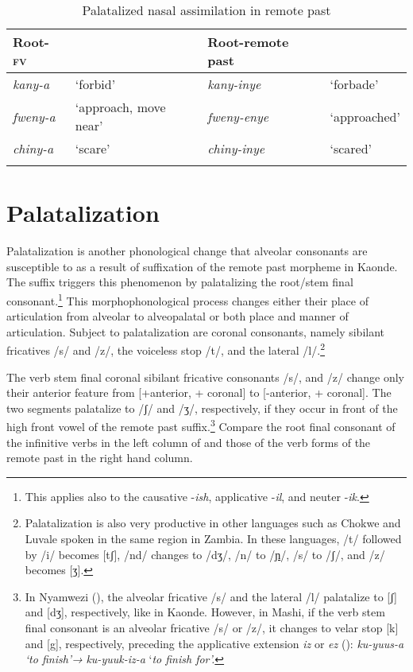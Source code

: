 \documentclass[output=paper]{langsci/langscibook}
\begin{document}
\begin{table}
\begin{tabularx}{\textwidth}{XllX}
\lsptoprule
Root-\textsc{fv} &  & Root-remote past & \\
\midrule 
\textit{kany-a} & `forbid' & \textit{kany-inye} & `forbade' \\
\textit{fweny-a} & `approach, move near' & \textit{fweny-enye} & `approached' \\
\textit{chiny-a} & `scare' & \textit{chiny-inye} & `scared' \\

\lspbottomrule
\end{tabularx}

\caption{Palatalized nasal assimilation in remote past}
\label{tab:8.kawasha}

 \end{table}


\section{Palatalization} \label{§3:palatalization.kawasha}

Palatalization is another phonological change that alveolar consonants are susceptible to as a result of suffixation of the remote past morpheme in Kaonde. The suffix triggers this phenomenon by palatalizing the root/stem final consonant.\footnote{This applies also to the causative -\textit{ish}, applicative -\textit{il}, and neuter -\textit{ik}.} This morphophonological process changes either their place of articulation from alveolar to alveopalatal or both place and manner of articulation. Subject to palatalization are coronal consonants, namely sibilant fricatives /s/ and /z/, the voiceless stop /t/, and the lateral /l/.\footnote{Palatalization is also very productive in other languages such as Chokwe and Luvale spoken in the same region in  Zambia. In these languages, /t/ followed by /i/ becomes [tʃ], /nd/ changes to /dʒ/, /n/ to /\href{http://en.wikipedia.org/wiki/Ɲ}{ɲ}/, /s/ to /ʃ/, and /z/ becomes [ʒ].} 

The verb stem final coronal sibilant fricative consonants /s/, and /z/ change only their anterior feature from [+anterior, + coronal] to [-anterior, + coronal]. The two segments palatalize to /ʃ/ and /ʒ/, respectively, if they occur in front of the high front vowel of the remote past suffix.\footnote{In Nyamwezi (\citealt{magangaschadeberg1992}), the alveolar fricative /s/ and the lateral /l/ palatalize to [ʃ] and [dʒ], respectively, like in Kaonde. However, in Mashi, if the verb stem final consonant is an alveolar fricative /s/ or /z/, it changes to velar stop [k] and [g], respectively, preceding the applicative extension \textit{iz} or \textit{ez} (\citealt{bashi2008}): \textit{ku-yuus-a }\textit{\textup{‘to finish’}}\textit{\textup{→}} \textit{ku-yuuk-iz-a} ‘\textit{\textup{to finish for’.}}} Compare the root final consonant of the infinitive verbs in the left column of  and those of the verb forms of the remote past in the right hand column.
\end{document}
